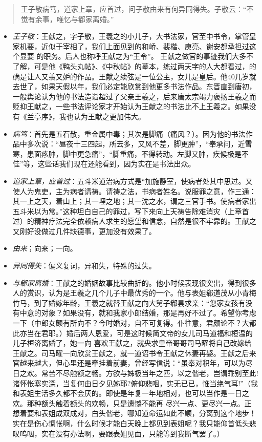 \documentclass[]{book}
\providecommand{\tightlist}{%
  \setlength{\itemsep}{0pt}\setlength{\parskip}{0pt}}
\begin{document}
\begin{quote}
王子敬病笃，道家上章，应首过，问子敬由来有何异同得失。子敬云：``不觉有余事，唯忆与郗家离婚。''
\end{quote}

\begin{itemize}
\tightlist
\item
  \emph{王子敬}：王献之，字子敬，王羲之的小儿子，大书法家，官至中书令，掌管皇家机要，近似于宰相了，我们上面见到的和峤、裴楷、庾亮、谢安都承担过这个显要
  的职务。后人也称呼王献之为``王令''。
  王献之做官的事迹我们大多不了解，可是他《鸭头丸帖》、《中秋帖》的摹本，练过两天字的人大都看过，的确是让人又羡又妒的作品。王献之续弦是一位公主，女儿是皇后。他40几岁就去世了，如果天假以年，我们必定能欣赏到他更多书法作品。东晋直到唐初，一般舆论认为他的书法造诣超过了父亲王羲之，后来唐太宗竭力褒扬王羲之而贬抑王献之，一些书法评论家才开始认为王献之的书法比不上王羲之。如果没有《兰亭序》，我也认为王献之更加伟大。
\item
  \emph{病笃}：首先是五石散，重金属中毒；其次是脚痛（痛风？）。因为他的书法作品中多次说：``昼夜十三四起，所去多，又风不差，脚更肿''，``奉承问，近雪寒，患面疼肿，脚中更急痛''，``脚重痛，不得转动。左脚又肿，疾候极是不佳''等，这些话我们现在还能看到，因为实在是书法出众。
\item
  \emph{道家上章，应首过}：五斗米道治病方式是``加施静室，使病者处其中思过。又使人为鬼吏，主为病者请祷。请祷之法，书病者姓名。说服罪之意，作三通：其一上之天，着山上；其一埋之地；其一沈之水，谓之三官手书。使病者家出五斗米以为常。''这种坦白自己的罪过，写下来向上天祷告除难消灾（上章首过）的精神疗法完全依赖病人求生的愿望和信念，自然是很不牢靠的。王献之又刚好没做过几件缺德事，更加没有效果了。
\item
  \emph{由来}；向来；一向。
\item
  \emph{异同得失}：偏义复词，异和失，特殊的过失。
\item
  \emph{与郗家离婚}：王献之的婚姻故事比较曲折的。他小时候表现很突出，得到很多人的赏识，认为是王羲之几个儿子中最优秀的一个。他与表姐郗道茂从小青梅竹马，到了婚嫁年龄，王羲之就替王献之向大舅子郗昙求亲：``您家女孩有没有中意的对象？如果没有，就和我家小郎结婚，那是再好不过了。希望你考虑一下（中郎女颇有所向不？今时婚对，自不可复得。仆往意，君颇论不？大都此亦当在君耶。）婚后两人恩爱，可是这时候简文帝的女儿司马道福和桓温的儿子桓济离婚了，她一向
  喜欢王献之，就央求皇帝哥哥司马曜将自己改嫁给王献之。司马曜一向欣赏王献之，就一道诏书令王献之休妻再娶。王献之后来官越来越大，但心里还是牵挂着前妻，曾经写信说：``虽奉对积年，可以为尽日之欢。常苦不尽触额之畅。方欲与姊极当年之匹，以之偕老，岂谓乖别至此!诸怀怅塞实深，当复何由日夕见姊耶?俯仰悲咽，实无已已，惟当绝气耳!''（我和表姐生活多久都不会厌的。即使是年复一年地相对，也可以当作是一日之欢。那种额头触着额头的欢畅，只是遗憾不能再
  尽兴一点、更尽兴一点。正想着要和表姐成双成对，白头偕老，哪知道命运如此不顺，分离到这个地步！实在是伤心惆怅啊，什么时候才能白天晚上都见到表姐呢？我只能仰首低头悲叹呜咽，实在没有办法啊，要跟表姐见面，只能等到我断气罢了。）
\end{itemize}
\end{document}
